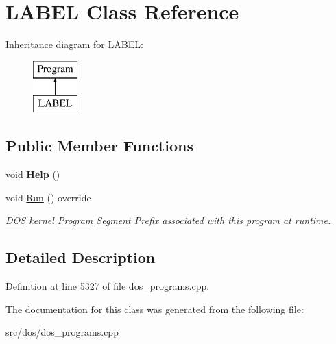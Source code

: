 \hypertarget{classLABEL}{\section{L\-A\-B\-E\-L Class Reference}
\label{classLABEL}
}
Inheritance diagram for L\-A\-B\-E\-L\-:\begin{figure}[H]
\begin{center}
\leavevmode
\includegraphics[height=2.000000cm]{classLABEL}
\end{center}
\end{figure}
\subsection*{Public Member Functions}
\begin{DoxyCompactItemize}
\item 
\hypertarget{classLABEL_ad6b2eb925e023fcbac597f6cf00d447f}{void {\bfseries Help} ()}\label{classLABEL_ad6b2eb925e023fcbac597f6cf00d447f}

\item 
\hypertarget{classLABEL_ac6fdf7e1b56f01f8e98cd7db4084f46c}{void \hyperlink{classLABEL_ac6fdf7e1b56f01f8e98cd7db4084f46c}{Run} () override}\label{classLABEL_ac6fdf7e1b56f01f8e98cd7db4084f46c}

\begin{DoxyCompactList}\small\item\em \hyperlink{classDOS}{D\-O\-S} kernel \hyperlink{classProgram}{Program} \hyperlink{structSegment}{Segment} Prefix associated with this program at runtime. \end{DoxyCompactList}\end{DoxyCompactItemize}


\subsection{Detailed Description}


Definition at line 5327 of file dos\-\_\-programs.\-cpp.



The documentation for this class was generated from the following file\-:\begin{DoxyCompactItemize}
\item 
src/dos/dos\-\_\-programs.\-cpp\end{DoxyCompactItemize}
